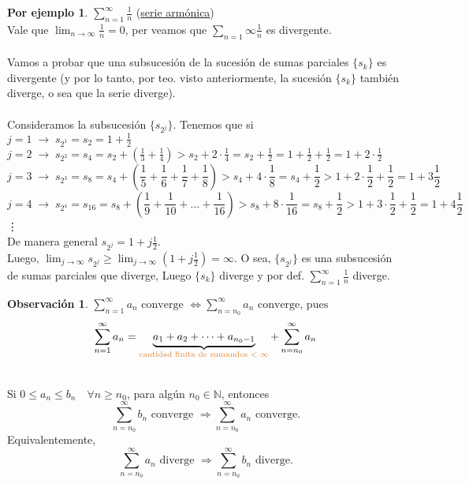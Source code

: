 \documentclass{article}
\theoremstyle{definition}
\theoremstyle{definition}
\newtheorem*{obs}{Observación}
\newtheorem*{ej}{Por ejemplo}
\theoremstyle{remark}
\begin{document}
\begin{ej}
  $\sum_{n=1}^{\infty}{\frac{1}{n}}$ \quad \big(\underline{serie armónica}\big) \\
Vale que $\lim_{n\to\infty}{\frac{1}{n}}=0$, per veamos que $\sum_{n=1}{\infty}{\frac{1}{n}}$ es divergente. \\\\
Vamos a probar que una subsucesión de la sucesión de sumas parciales $\{s_k\}$ es divergente (y por lo tanto, por teo. visto anteriormente, la sucesión $\{s_k\}$ también diverge, o sea que la serie diverge). \\\\
Consideramos la subsucesión $\{s_{2^j}\}$. Tenemos que si \\
$j=1 \; \longrightarrow \; s_{2^1}=s_2=1+\frac{1}{2}$ \\
$j=2 \; \longrightarrow \; s_{2^2}=s_4=s_2+\left(\frac{1}{3}+\frac{1}{4}\right)>s_2+2\cdot \frac{1}{4}=s_2+\frac{1}{2}=1+\frac{1}{2}+\frac{1}{2}=1+2\cdot\frac{1}{2}$ \\
$$j=3\;  \longrightarrow \; s_{2^3}=s_8=s_4+\left(\frac{1}{5}+\frac{1}{6}+\frac{1}{7}+\frac{1}{8}\right)>s_4+4\cdot\frac{1}{8}=s_4+\frac{1}{2}>1+2\cdot\frac{1}{2}+\frac{1}{2}=1+3\frac{1}{2}$$
$$j=4\;\longrightarrow \; s_{2^4}=s_{16}=s_8+\left(\frac{1}{9}+\frac{1}{10}+\dots+\frac{1}{16}\right)>s_8+8\cdot\frac{1}{16}=s_8+\frac{1}{2}>1+3\cdot\frac{1}{2}+\frac{1}{2}=1+4\frac{1}{2}$$ \vdots \\
De manera general $s_{2^j}=1+j\frac{1}{2}$.\\
Luego, $\lim_{j \to \infty}{s_{2^j}} \geq \lim_{j \to \infty} \left(1+j\frac{1}{2}\right)=\infty$. O sea, $\{s_{2^j}\}$ es una subsucesión  de sumas parciales que diverge, Luego $\{s_k\}$ diverge y por def. $\sum_{n=1}^{\infty}{\frac{1}{n}}$ diverge.
\end{ej}

\begin{obs}
  $\sum_{n=1}^{\infty}{a_n} \text{ converge } \Longleftrightarrow \sum_{n=n_0}^{\infty}{a_n} \text{ converge, pues}$ $$
  \sum_{n=1}^{\infty}{a_n}=\underbrace{a_1+a_2+\dots+a_{n_0-1}}_{\textcolor{rojop2}{\text{cantidad finita de sumandos } <\; \infty}}+\sum_{n=n_0}^{\infty}{a_n}
  $$
\end{obs}

\begin{teo} \; \\
  Si $0 \leq a_n \leq b_n \quad \forall n \geq n_0$, para algún $n_0 \in \mathbb{N}$, entonces $$\sum_{n=n_0}^{\infty}{b_n}\text{ converge }\Rightarrow \sum_{n=n_0}^{\infty}{a_n} \text{ converge.}$$
  Equivalentemente,$$
  \sum_{n=n_0}^{\infty}a_n \text{ diverge } \Rightarrow \sum_{n=n_0}^{\infty}{b_n} \text{ diverge}
  .$$
\end{teo}
\end{document}
